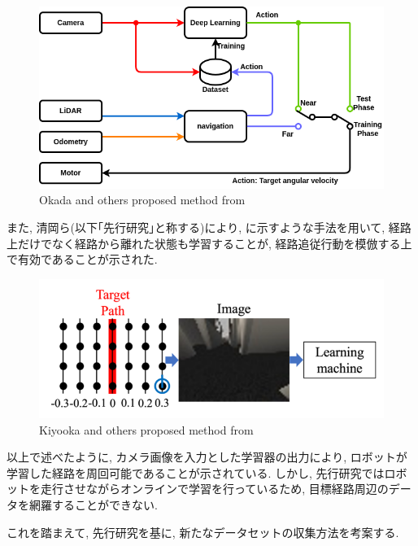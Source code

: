 \begin{figure}[h]
     \centering
     \includegraphics[keepaspectratio, scale=0.45]
     {images/okada-method.png}
     \caption{Okada and others proposed method from \cite{okada-si}}
     \label{Fig:okada-method}
     \end{figure}

\newpage
また, 清岡ら\cite{kiyooka-si}(以下｢先行研究｣と称する)により, に示すような手法を用いて, 経路上だけでなく経路から離れた状態も学習することが, 経路追従行動を模倣する上で有効であることが示された. 

\vspace{10mm}

\begin{figure}[h]
     \centering
     \includegraphics[keepaspectratio, scale=0.45]{images/kiyooka-si-1.png}
     \caption{Kiyooka and others proposed method from \cite{kiyooka-si}}
     \label{Fig:kiyooka-si}
     \end{figure}

\vspace{20mm}
以上で述べたように, カメラ画像を入力とした学習器の出力により, ロボットが学習した経路を周回可能であることが示されている. しかし, 先行研究ではロボットを走行させながらオンラインで学習を行っているため, 目標経路周辺のデータを網羅することができない. \par これを踏まえて, 先行研究を基に, 新たなデータセットの収集方法を考案する.

